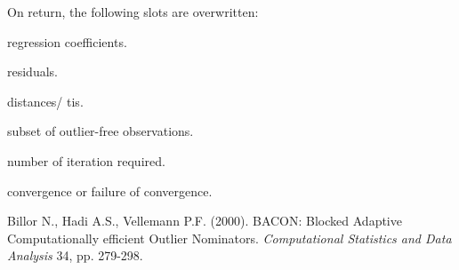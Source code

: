 \documentclass[a4paper,oneside,10pt,DIV=12]{scrreprt}
\begin{document}
\begin{Value}
On return, the following slots are overwritten:
	\begin{ldescription}
		\item[\code{beta}] regression coefficients.
		\item[\code{resid}] residuals. 
		\item[\code{dist}] distances/ tis.
		\item[\code{subset0}] subset of outlier-free observations.
		\item[\code{maxiter}] number of iteration required.
		\item[\code{success}] convergence or failure of convergence. 
	\end{ldescription}
\end{Value}
\begin{References}
Billor N., Hadi A.S., Vellemann P.F. (2000). BACON: Blocked Adaptive 
Computationally efficient Outlier Nominators. \textit{Computational Statistics
and Data Analysis} 34, pp. 279-298.
\end{References}
\end{document}
